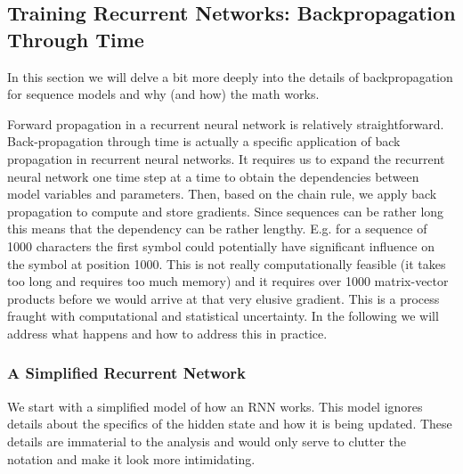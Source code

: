 


\subsection{Training Recurrent Networks: Backpropagation Through Time}

In this section we will delve a bit more deeply into the details of backpropagation for sequence models and why (and how) the math works.

Forward propagation in a recurrent neural network is relatively straightforward. Back-propagation through time is actually a specific application of back propagation in recurrent neural networks. It requires us to expand the recurrent neural network one time step at a time to obtain the dependencies between model variables and parameters. Then, based on the chain rule, we apply back propagation to compute and store gradients. Since sequences can be rather long this means that the dependency can be rather lengthy. E.g. for a sequence of 1000 characters the first symbol could potentially have significant influence on the symbol at position 1000. This is not really computationally feasible (it takes too long and requires too much memory) and it requires over 1000 matrix-vector products before we would arrive at that very elusive gradient. This is a process fraught with computational and statistical uncertainty. In the following we will address what happens and how to address this in practice.

\subsubsection{A Simplified Recurrent Network}
We start with a simplified model of how an RNN works. This model ignores details about the specifics of the hidden state and how it is being updated. These details are immaterial to the analysis and would only serve to clutter the notation and make it look more intimidating.

